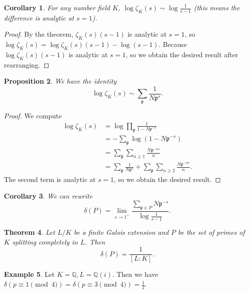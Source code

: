\documentclass[leqno, openany]{memoir}
\newtheorem{thm}{Theorem}[section]
\newtheorem{cor}[thm]{Corollary}
\newtheorem{prop}[thm]{Proposition}
\theoremstyle{definition}
\newtheorem{exm}[thm]{Example}
\theoremstyle{remark}
\theoremstyle{plain}
\theoremstyle{definition}
\theoremstyle{remark}
\newcommand{\Q}{\mathbb{Q}}
\newcommand{\mf}[1]{\mathfrak{#1}}
\begin{document}
\begin{cor}
    For any number field $K$, $\log \zeta_K(s) \sim \log \frac{1}{s-1}$ (this means the difference is analytic at $s=1$).
\end{cor}

\begin{proof}
    By the theorem, $\zeta_K(s) (s-1)$ is analytic at $s=1$, so $\log \zeta_K(s) = \log \zeta_K(s)(s-1) - \log (s-1)$. Because $\log \zeta_K(s)(s-1)$ is analytic at $s=1$, so we obtain the desired result after rearranging.
\end{proof}

\begin{prop}
    We have the identity
    \[ \log \zeta_K(s) \sim \sum_{\mf{p}} \frac{1}{N\mf{p}^s}. \]
\end{prop}
\begin{proof}
    We compute
    \begin{align*}
        \log \zeta_K(s) &= \log \prod_{\mf{p}} \frac{1}{1-N\mf{p}^{-s}} \\
                        &= - \sum_{\mf{p}} \log(1-N\mf{p}^{-s}) \\
                        &= \sum_{\mf{p}} \sum_{n \geq 1} \frac{N\mf{p}^{-ns}}{n} \\
                        &= \sum_{\mf{p}} \frac{1}{N\mf{p}^s} + \sum_{\mf{p}} \sum_{n \geq 2} \frac{N\mf{p}^{-ns}}{n}. 
    \end{align*}
    The second term is analytic at $s=1$, so we obtain the desired result.
\end{proof}

\begin{cor}
    We can rewrite
    \[ \delta(P) = \lim_{s \to 1^+} \frac{\sum_{\mf{p}\in P} N\mf{p}^{-s}}{\log \frac{1}{s-1}}. \]
\end{cor}

\begin{thm}
    Let $L/K$ be a finite Galois extension and $P$ be the set of primes of $K$ splitting completely in $L$. Then
    \[ \delta(P) = \frac{1}{[L:K]}. \]
\end{thm}

\begin{exm}
    Let $K = \Q, L = \Q(i)$. Then we have $\delta(p \equiv 1 \pmod{4}) = \delta(p \equiv 3 \pmod{4}) = \frac{1}{2}$.
\end{exm}
\end{document}
